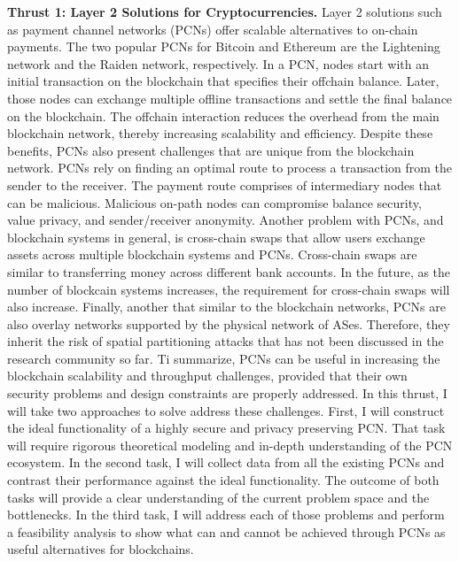 \documentclass{NSF}
\newcommand{\BfPara}[1]{{\noindent\textbf{#1.}}\xspace}
\begin{document}
\BfPara{Thrust 1: Layer 2 Solutions for Cryptocurrencies} Layer 2 solutions such as payment channel networks (PCNs) offer scalable alternatives to on-chain payments. The two popular PCNs for Bitcoin and Ethereum are the Lightening network and the Raiden network, respectively. In a PCN, nodes start with an initial transaction on the blockchain that specifies their offchain balance. Later, those nodes can exchange multiple offline transactions and settle the final balance on the blockchain. The offchain interaction reduces the overhead from the main blockchain network, thereby increasing scalability and efficiency. Despite these benefits, PCNs also present challenges that are unique from the blockchain network. PCNs rely on finding an optimal route to process a transaction from the sender to the receiver. The payment route comprises of intermediary nodes that can be malicious. Malicious on-path nodes can compromise balance security, value privacy, and sender/receiver anonymity. Another problem with PCNs, and blockchain systems in general, is cross-chain swaps that allow users exchange assets across multiple blockchain systems and PCNs. Cross-chain swaps are similar to transferring money across different bank accounts. In the future, as the number of blockcain systems increases, the requirement for cross-chain swaps will also increase. Finally, another that similar to the blockchain networks, PCNs are also overlay networks supported by the physical network of ASes. Therefore, they inherit the risk of spatial partitioning attacks that has not been discussed in the research community so far. Ti summarize, PCNs can be useful in increasing the blockchain scalability and throughput challenges, provided that their own security problems and design constraints are properly addressed. In this thrust, I will take two approaches to solve address these challenges. First, I will construct the ideal functionality of a highly secure and privacy preserving PCN. That task will require rigorous theoretical modeling and in-depth understanding of the PCN ecosystem. In the second task, I will collect data from all the existing PCNs and contrast their performance against the ideal functionality. The outcome of both tasks will provide a clear understanding of the current problem space and the bottlenecks. In the third task, I will address each of those problems and perform a feasibility analysis to show what can and cannot be achieved through PCNs as useful alternatives for blockchains. 
\end{document}
